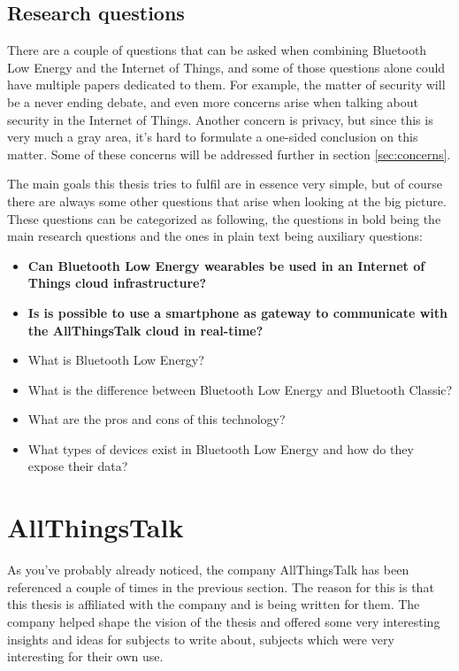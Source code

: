 \documentclass[pdftex,a4paper,12pt,twoside]{report}
\begin{document}
\subsection{Research questions}
\label{subsec:researchquestions}
There are a couple of questions that can be asked when combining Bluetooth Low Energy and the Internet of Things, and some of those questions alone could have multiple papers dedicated to them. For example, the matter of security will be a never ending debate, and even more concerns arise when talking about security in the Internet of Things. Another concern is privacy, but since this is very much a gray area, it's hard to formulate a one-sided conclusion on this matter. Some of these concerns will be addressed further in section \ref{sec:concerns}.

The main goals this thesis tries to fulfil are in essence very simple, but of course there are always some other questions that arise when looking at the big picture. These questions can be categorized as following, the questions in bold being the main research questions and the ones in plain text being auxiliary questions:
\begin{itemize}
	\item{\textbf{Can Bluetooth Low Energy wearables be used in an Internet of Things cloud infrastructure?}}
	\item{\textbf{Is is possible to use a smartphone as gateway to communicate with the AllThingsTalk cloud in real-time?}}
	\item{What is Bluetooth Low Energy?}
	\item{What is the difference between Bluetooth Low Energy and Bluetooth Classic?}
	\item{What are the pros and cons of this technology?}
	\item{What types of devices exist in Bluetooth Low Energy and how do they expose their data?}
\end{itemize}

\section{AllThingsTalk}
\label{sec:allthingstalk}
As you've probably already noticed, the company AllThingsTalk has been referenced a couple of times in the previous section. The reason for this is that this thesis is affiliated with the company and is being written for them. The company helped shape the vision of the thesis and offered some very interesting insights and ideas for subjects to write about, subjects which were very interesting for their own use.
\end{document}
